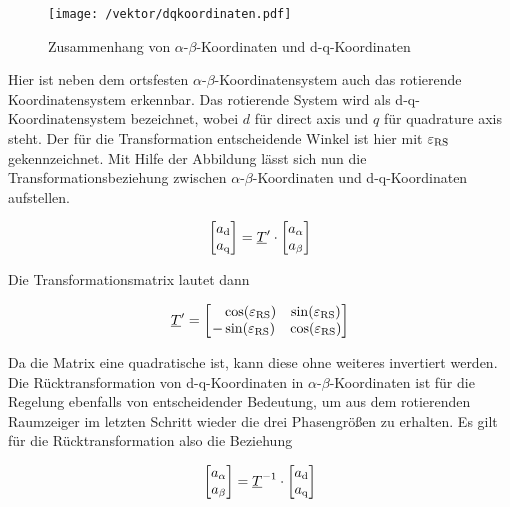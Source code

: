 \begin{figure}[h]
	\centering
	\texttt{[image: /vektor/dqkoordinaten.pdf]}
	\label{fig:dqkoordinaten}
	\caption{Zusammenhang von $\alpha$-$\beta$-Koordinaten und d-q-Koordinaten}
\end{figure}


Hier ist neben dem ortsfesten $\alpha$-$\beta$-Koordinatensystem auch das rotierende Koordinatensystem erkennbar. 
Das rotierende System wird als d-q-Koordinatensystem bezeichnet, wobei $d$ für direct axis und $q$ für quadrature axis steht.
Der für die Transformation entscheidende Winkel ist hier mit $\varepsilon_{\mathrm{RS}}$ gekennzeichnet.
Mit Hilfe der Abbildung lässt sich nun die Transformationsbeziehung zwischen $\alpha$-$\beta$-Koordinaten und d-q-Koordinaten aufstellen.

\begin{align}
	\begin{bmatrix}
		a_{\mathrm{d}} \\
		a_{\mathrm{q}} 
	\end{bmatrix}
	=\underline{T}{^\prime}\cdot 
	\begin{bmatrix}
		a_{\alpha} \\
		a_{\beta}
	\end{bmatrix}
	\label{parkvektor}
\end{align}

Die Transformationsmatrix lautet dann

\begin{align}
	\underline{T}{^\prime} =
	\begin{bmatrix}
		~~~\cos({\varepsilon_{\mathrm{RS}}}) & \sin({\varepsilon_{\mathrm{RS}}}) \\
		-\sin({\varepsilon_{\mathrm{RS}}}) & \cos({\varepsilon_{\mathrm{RS}}})
	\end{bmatrix}
	\label{parkmatrix}
\end{align}

Da die Matrix eine quadratische ist, kann diese ohne weiteres invertiert werden.
Die Rücktransformation von d-q-Koordinaten in $\alpha$-$\beta$-Koordinaten ist für die Regelung ebenfalls von entscheidender Bedeutung, um aus dem rotierenden Raumzeiger im letzten Schritt wieder die drei Phasengrößen zu erhalten. 
Es gilt für die Rücktransformation also die Beziehung

\begin{align}
	\begin{bmatrix}
		a_{\alpha} \\
		a_{\beta}
	\end{bmatrix}
	=\underline{T}^{-1}\cdot 
	\begin{bmatrix}
		a_{\mathrm{d}} \\
		a_{\mathrm{q}} 
	\end{bmatrix}
	\label{parkvektorinvers}
\end{align}

